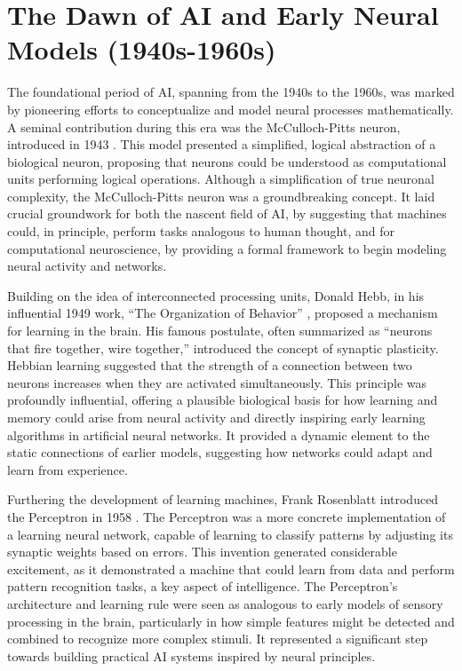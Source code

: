 \documentclass[11pt,a4paper]{article}
\begin{document}
\section{The Dawn of AI and Early Neural Models (1940s-1960s)}

The foundational period of AI, spanning from the 1940s to the 1960s, was marked by pioneering efforts to conceptualize and model neural processes mathematically. A seminal contribution during this era was the McCulloch-Pitts neuron, introduced in 1943 \cite{mcculloch1943logical}. This model presented a simplified, logical abstraction of a biological neuron, proposing that neurons could be understood as computational units performing logical operations. Although a simplification of true neuronal complexity, the McCulloch-Pitts neuron was a groundbreaking concept. It laid crucial groundwork for both the nascent field of AI, by suggesting that machines could, in principle, perform tasks analogous to human thought, and for computational neuroscience, by providing a formal framework to begin modeling neural activity and networks.

Building on the idea of interconnected processing units, Donald Hebb, in his influential 1949 work, ``The Organization of Behavior'' \cite{hebb1949organization}, proposed a mechanism for learning in the brain. His famous postulate, often summarized as ``neurons that fire together, wire together,'' introduced the concept of synaptic plasticity. Hebbian learning suggested that the strength of a connection between two neurons increases when they are activated simultaneously. This principle was profoundly influential, offering a plausible biological basis for how learning and memory could arise from neural activity and directly inspiring early learning algorithms in artificial neural networks. It provided a dynamic element to the static connections of earlier models, suggesting how networks could adapt and learn from experience.

Furthering the development of learning machines, Frank Rosenblatt introduced the Perceptron in 1958 \cite{rosenblatt1958perceptron}. The Perceptron was a more concrete implementation of a learning neural network, capable of learning to classify patterns by adjusting its synaptic weights based on errors. This invention generated considerable excitement, as it demonstrated a machine that could learn from data and perform pattern recognition tasks, a key aspect of intelligence. The Perceptron's architecture and learning rule were seen as analogous to early models of sensory processing in the brain, particularly in how simple features might be detected and combined to recognize more complex stimuli. It represented a significant step towards building practical AI systems inspired by neural principles.
\end{document}
